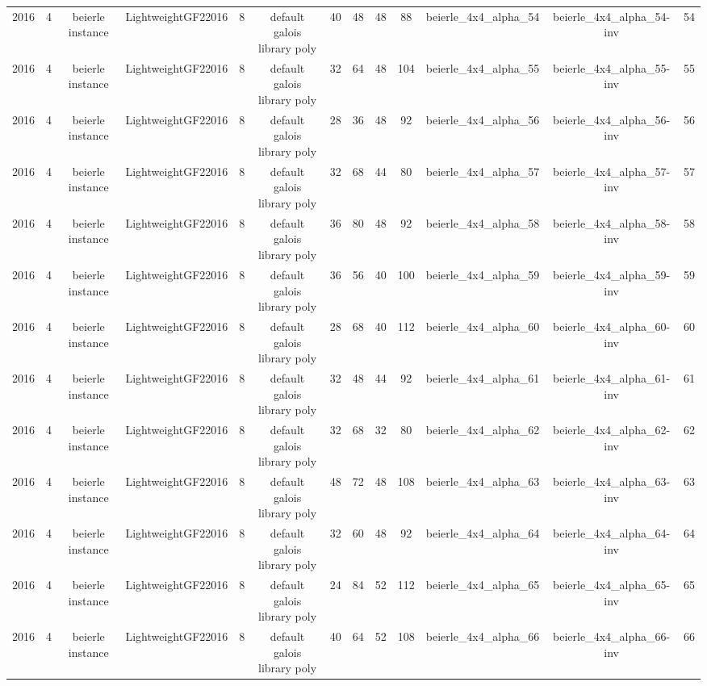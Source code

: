 \begin{tabular}{c c c c c c c c c c c c c}
2016 & 4 & beierle instance & LightweightGF22016 & 8 & default galois library poly & 40 & 48 & 48 & 88 & beierle_4x4_alpha_54 & beierle_4x4_alpha_54-inv & 54 \\
2016 & 4 & beierle instance & LightweightGF22016 & 8 & default galois library poly & 32 & 64 & 48 & 104 & beierle_4x4_alpha_55 & beierle_4x4_alpha_55-inv & 55 \\
2016 & 4 & beierle instance & LightweightGF22016 & 8 & default galois library poly & 28 & 36 & 48 & 92 & beierle_4x4_alpha_56 & beierle_4x4_alpha_56-inv & 56 \\
2016 & 4 & beierle instance & LightweightGF22016 & 8 & default galois library poly & 32 & 68 & 44 & 80 & beierle_4x4_alpha_57 & beierle_4x4_alpha_57-inv & 57 \\
2016 & 4 & beierle instance & LightweightGF22016 & 8 & default galois library poly & 36 & 80 & 48 & 92 & beierle_4x4_alpha_58 & beierle_4x4_alpha_58-inv & 58 \\
2016 & 4 & beierle instance & LightweightGF22016 & 8 & default galois library poly & 36 & 56 & 40 & 100 & beierle_4x4_alpha_59 & beierle_4x4_alpha_59-inv & 59 \\
2016 & 4 & beierle instance & LightweightGF22016 & 8 & default galois library poly & 28 & 68 & 40 & 112 & beierle_4x4_alpha_60 & beierle_4x4_alpha_60-inv & 60 \\
2016 & 4 & beierle instance & LightweightGF22016 & 8 & default galois library poly & 32 & 48 & 44 & 92 & beierle_4x4_alpha_61 & beierle_4x4_alpha_61-inv & 61 \\
2016 & 4 & beierle instance & LightweightGF22016 & 8 & default galois library poly & 32 & 68 & 32 & 80 & beierle_4x4_alpha_62 & beierle_4x4_alpha_62-inv & 62 \\
2016 & 4 & beierle instance & LightweightGF22016 & 8 & default galois library poly & 48 & 72 & 48 & 108 & beierle_4x4_alpha_63 & beierle_4x4_alpha_63-inv & 63 \\
2016 & 4 & beierle instance & LightweightGF22016 & 8 & default galois library poly & 32 & 60 & 48 & 92 & beierle_4x4_alpha_64 & beierle_4x4_alpha_64-inv & 64 \\
2016 & 4 & beierle instance & LightweightGF22016 & 8 & default galois library poly & 24 & 84 & 52 & 112 & beierle_4x4_alpha_65 & beierle_4x4_alpha_65-inv & 65 \\
2016 & 4 & beierle instance & LightweightGF22016 & 8 & default galois library poly & 40 & 64 & 52 & 108 & beierle_4x4_alpha_66 & beierle_4x4_alpha_66-inv & 66 \\

\end{tabular}
